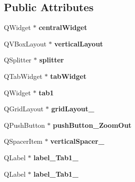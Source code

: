 \subsection*{Public Attributes}
\begin{DoxyCompactItemize}
\item 
\mbox{\label{classUi__MainWindow_a30075506c2116c3ed4ff25e07ae75f81}} 
Q\+Widget $\ast$ {\bfseries central\+Widget}
\item 
\mbox{\label{classUi__MainWindow_aecd96a04789fcfec3f98d80390ad8184}} 
Q\+V\+Box\+Layout $\ast$ {\bfseries vertical\+Layout}
\item 
\mbox{\label{classUi__MainWindow_abfba98fab6f5677d35fa69dd46ef8ffb}} 
Q\+Splitter $\ast$ {\bfseries splitter}
\item 
\mbox{\label{classUi__MainWindow_a3260b943854b841c986f47c4726ee7f9}} 
Q\+Tab\+Widget $\ast$ {\bfseries tab\+Widget}
\item 
\mbox{\label{classUi__MainWindow_aa8380b3fb3a983b71985fb1c17e10604}} 
Q\+Widget $\ast$ {\bfseries tab1}
\item 
\mbox{\label{classUi__MainWindow_a6b2a0c5f7e8ff2a87134908dd770d2d2}} 
Q\+Grid\+Layout $\ast$ {\bfseries grid\+Layout\+\_}
\item 
\mbox{\label{classUi__MainWindow_ad19ba51714bb082f6acdfaab8e11aa8e}} 
Q\+Push\+Button $\ast$ {\bfseries push\+Button\+\_\+\+Zoom\+Out}
\item 
\mbox{\label{classUi__MainWindow_adc1f5fdd97fb3729999c56902d0fa591}} 
Q\+Spacer\+Item $\ast$ {\bfseries vertical\+Spacer\+\_}
\item 
\mbox{\label{classUi__MainWindow_a960104c3b657c86b6d881b4cd004000e}} 
Q\+Label $\ast$ {\bfseries label\+\_\+\+Tab1\+\_}
\item 
\mbox{\label{classUi__MainWindow_a9e4f15ef98081aa4caeb772f51e6c2dc}} 
Q\+Label $\ast$ {\bfseries label\+\_\+\+Tab1\+\_}

\end{DoxyCompactItemize}
